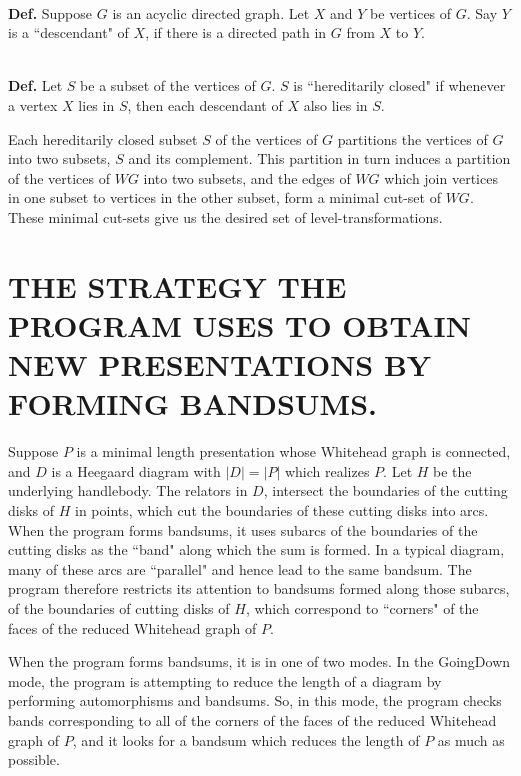 \documentclass[12pt]{amsart}
\newcommand{\definition}{\ \\ \noindent \textbf{Def.} }
\begin{document}
        \definition     Suppose $G$ is an acyclic directed graph. Let $X$ and $Y$ be vertices of $G$. Say $Y$ is
        a  ``descendant" of $X$, if there is a directed path in $G$ from $X$ to $Y$.
        
        \definition     Let $S$ be a subset of the vertices of $G$. $S$ is  ``hereditarily closed" if whenever
        a vertex $X$ lies in $S$, then each descendant of $X$ also lies in $S$.
        
                Each hereditarily closed subset $S$ of the vertices of $G$ partitions the vertices of $G$
        into two subsets, $S$ and its complement. This partition in turn induces a partition of the
        vertices of $WG$ into two subsets, and the edges of $WG$ which join vertices in one subset to
        vertices in the other subset, form a minimal cut-set of $WG$. These minimal cut-sets give
        us the desired set of level-transformations.
        
                
        
\section{THE STRATEGY THE PROGRAM USES TO OBTAIN NEW PRESENTATIONS BY FORMING BANDSUMS.}
        
                Suppose $P$ is a minimal length presentation whose Whitehead graph is connected, and
        $D$ is a Heegaard diagram with $|D| = |P|$ which realizes $P$. Let $H$ be the underlying 
        handlebody. The relators in $D$, intersect the boundaries of the cutting disks of $H$ in        
        points, which cut the boundaries of these cutting disks into arcs. When the program
        forms bandsums, it uses subarcs of the boundaries of the cutting disks as the  ``band"
        along which the sum is formed. In a typical diagram, many of these arcs are  ``parallel"
        and hence lead to the same bandsum. The program therefore restricts its attention to
        bandsums formed along those subarcs, of the boundaries of cutting disks of $H$, which
        correspond to  ``corners" of the faces of the reduced Whitehead graph of $P$.
        
                When the program forms bandsums, it is in one of two modes. In the GoingDown mode,
        the program is attempting to reduce the length of a diagram by performing automorphisms
        and bandsums. So, in this mode, the program checks bands corresponding to all of the
        corners of the faces of the reduced Whitehead graph of $P$, and it looks for a bandsum
        which reduces the length of $P$ as much as possible.
\end{document}
